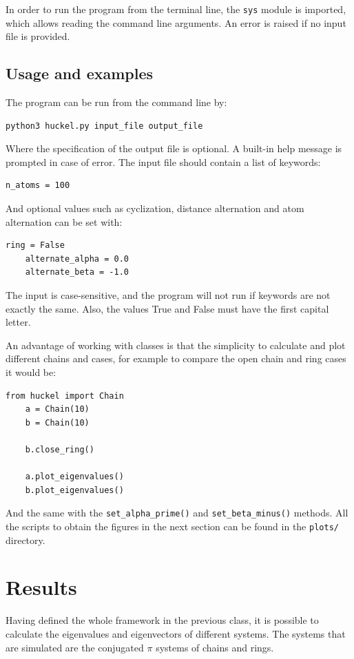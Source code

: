 \documentclass{article}
\begin{document}
In order to run the program from the terminal line, the \texttt{sys} module is imported, which allows reading the command line arguments. An error is raised if no input file is provided. 

\subsection{Usage and examples}
The program can be run from the command line by:
\begin{lstlisting}[backgroundcolor=\color{LightGray}]
    python3 huckel.py input_file output_file
\end{lstlisting} 
Where the specification of the output file is optional. A built-in help message is prompted in case of error. The input file should contain a list of keywords:

\begin{lstlisting}[backgroundcolor=\color{LightGray}]
    n_atoms = 100
\end{lstlisting} 
And optional values such as cyclization, distance alternation and atom alternation can be set with:
\begin{lstlisting}[backgroundcolor=\color{LightGray}]
    ring = False
    alternate_alpha = 0.0
    alternate_beta = -1.0
\end{lstlisting} 
The input is case-sensitive, and the program will not run if keywords are not exactly the same. Also, the values True and False must have the first capital letter.

An advantage of working with classes is that the simplicity to calculate and plot different chains and cases, for example to compare the open chain and ring cases it would be:
\begin{lstlisting}[backgroundcolor=\color{LightGray}]
    from huckel import Chain
    a = Chain(10)
    b = Chain(10)
    
    b.close_ring()
    
    a.plot_eigenvalues()
    b.plot_eigenvalues()
\end{lstlisting} 
And the same with the  \texttt{set\_alpha\_prime()} and \texttt{set\_beta\_minus()} methods. All the scripts to obtain the figures in the next section can be found in the \texttt{plots/} directory. 

\section{Results}
Having defined the whole framework in the previous class, it is possible to calculate the eigenvalues and eigenvectors of different systems. The systems that are simulated are the conjugated $\pi$ systems of chains and rings. 
\end{document}
